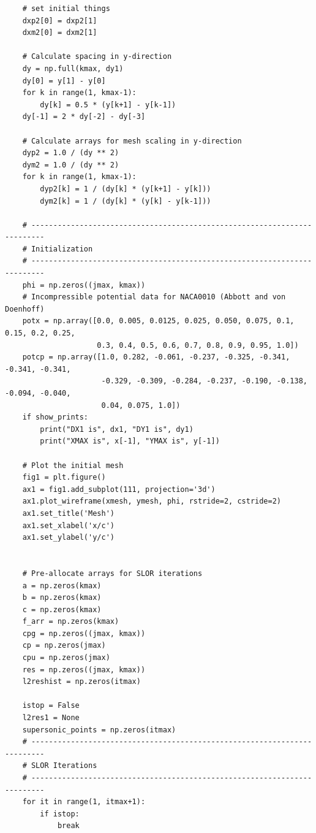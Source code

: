 \documentclass[12pt]{article}
\theoremstyle{definition}
\begin{document}
\begin{verbatim}
    # set initial things
    dxp2[0] = dxp2[1]
    dxm2[0] = dxm2[1]

    # Calculate spacing in y-direction
    dy = np.full(kmax, dy1)
    dy[0] = y[1] - y[0]
    for k in range(1, kmax-1):
        dy[k] = 0.5 * (y[k+1] - y[k-1])
    dy[-1] = 2 * dy[-2] - dy[-3]

    # Calculate arrays for mesh scaling in y-direction
    dyp2 = 1.0 / (dy ** 2)
    dym2 = 1.0 / (dy ** 2)
    for k in range(1, kmax-1):
        dyp2[k] = 1 / (dy[k] * (y[k+1] - y[k]))
        dym2[k] = 1 / (dy[k] * (y[k] - y[k-1]))

    # -------------------------------------------------------------------------
    # Initialization
    # -------------------------------------------------------------------------
    phi = np.zeros((jmax, kmax))
    # Incompressible potential data for NACA0010 (Abbott and von Doenhoff)
    potx = np.array([0.0, 0.005, 0.0125, 0.025, 0.050, 0.075, 0.1, 0.15, 0.2, 0.25,
                     0.3, 0.4, 0.5, 0.6, 0.7, 0.8, 0.9, 0.95, 1.0])
    potcp = np.array([1.0, 0.282, -0.061, -0.237, -0.325, -0.341, -0.341, -0.341,
                      -0.329, -0.309, -0.284, -0.237, -0.190, -0.138, -0.094, -0.040,
                      0.04, 0.075, 1.0]) 
    if show_prints:
        print("DX1 is", dx1, "DY1 is", dy1)
        print("XMAX is", x[-1], "YMAX is", y[-1])
    
    # Plot the initial mesh
    fig1 = plt.figure()
    ax1 = fig1.add_subplot(111, projection='3d')
    ax1.plot_wireframe(xmesh, ymesh, phi, rstride=2, cstride=2)
    ax1.set_title('Mesh')
    ax1.set_xlabel('x/c')
    ax1.set_ylabel('y/c')
    

    # Pre-allocate arrays for SLOR iterations
    a = np.zeros(kmax)
    b = np.zeros(kmax)
    c = np.zeros(kmax)
    f_arr = np.zeros(kmax)
    cpg = np.zeros((jmax, kmax))
    cp = np.zeros(jmax)
    cpu = np.zeros(jmax)
    res = np.zeros((jmax, kmax))
    l2reshist = np.zeros(itmax)
    
    istop = False
    l2res1 = None
    supersonic_points = np.zeros(itmax) 
    # -------------------------------------------------------------------------
    # SLOR Iterations
    # -------------------------------------------------------------------------
    for it in range(1, itmax+1):
        if istop:
            break


\end{verbatim}
\end{document}
